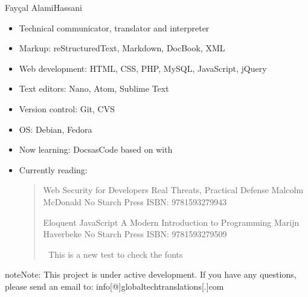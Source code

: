 \documentclass[letterpaper,10pt,english]{sphinxmanual}
\begin{document}
\sphinxAtStartPar
Fayçal Alami\sphinxhyphen{}Hassani \sphinxhyphen{}  \sphinxhyphen{} 
\begin{itemize}
\item {} 
\sphinxAtStartPar
Technical communicator, translator and interpreter

\item {} 
\sphinxAtStartPar
Markup: reStructuredText, Markdown, DocBook, XML

\item {} 
\sphinxAtStartPar
Web development: HTML, CSS, PHP, MySQL, JavaScript, jQuery

\item {} 
\sphinxAtStartPar
Text editors: Nano, Atom, Sublime Text

\item {} 
\sphinxAtStartPar
Version control: Git, CVS

\item {} 
\sphinxAtStartPar
OS: Debian, Fedora

\item {} 
\sphinxAtStartPar
Now learning: Docs\sphinxhyphen{}as\sphinxhyphen{}Code based on  with 

\item {} 
\sphinxAtStartPar
Currently reading:
\begin{quote}

\sphinxAtStartPar
{} Web Security for Developers \sphinxhyphen{} Real Threats, Practical Defense \sphinxhyphen{} Malcolm McDonald \sphinxhyphen{} No Starch Press \sphinxhyphen{} ISBN: 978\sphinxhyphen{}1\sphinxhyphen{}59327\sphinxhyphen{}994\sphinxhyphen{}3

\sphinxAtStartPar
{} Eloquent JavaScript \sphinxhyphen{} A Modern Introduction to Programming \sphinxhyphen{} Marijn Haverbeke \sphinxhyphen{} No Starch Press \sphinxhyphen{} ISBN: 978\sphinxhyphen{}1\sphinxhyphen{}59327950\sphinxhyphen{}9

\sphinxAtStartPar
📕 This is a new test to check the fonts
\end{quote}

\end{itemize}

\begin{sphinxadmonition}{note}{Note:}
\sphinxAtStartPar
This project is under active development. If you have any questions, please send an email to: info{[}@{]}globaltech\sphinxhyphen{}translations{[}.{]}com \sphinxhyphen{} 
\end{sphinxadmonition}
\end{document}
